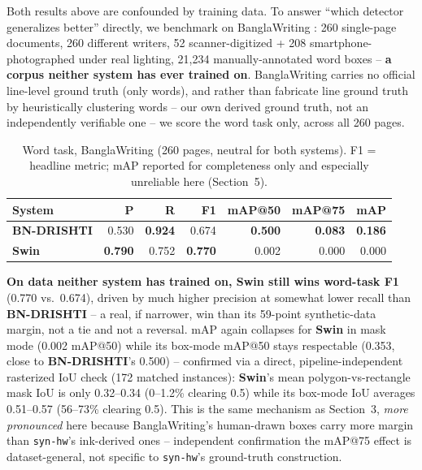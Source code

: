 \documentclass[10pt]{article}
\newcommand{\swin}{\textbf{Swin}}
\newcommand{\bnd}{\textbf{BN-DRISHTI}}
\begin{document}
Both results above are confounded by training data. To answer ``which detector
generalizes better'' directly, we benchmark on BanglaWriting
\cite{mridha2021banglawriting}: 260 single-page documents, 260 different writers, 52
scanner-digitized + 208 smartphone-photographed under real lighting, 21{,}234
manually-annotated word boxes -- \textbf{a corpus neither system has ever trained on}.
BanglaWriting carries no official line-level ground truth (only words), and rather
than fabricate line ground truth by heuristically clustering words -- our own derived
ground truth, not an independently verifiable one -- we score the word task only,
across all 260 pages.

\begin{table}[H]
\centering
\footnotesize
\caption{Word task, BanglaWriting (260 pages, neutral for both systems). F1 = headline
metric; mAP reported for completeness only and especially unreliable here (Section~5).}
\begin{tabular}{@{}lrrrrrr@{}}
\toprule
System & P & R & F1 & mAP@50 & mAP@75 & mAP \\
\midrule
\bnd{}         & 0.530 & \textbf{0.924} & 0.674 & \textbf{0.500} & \textbf{0.083} & \textbf{0.186} \\
\textbf{Swin} & \textbf{0.790} & 0.752 & \textbf{0.770} & 0.002 & 0.000 & 0.000 \\
\bottomrule
\end{tabular}
\end{table}

\textbf{On data neither system has trained on, \swin{} still wins word-task F1}
(0.770 vs.\ 0.674), driven by much higher precision at somewhat lower recall than
\bnd{} -- a real, if narrower, win than its 59-point synthetic-data margin, not a tie
and not a reversal. mAP again collapses for \swin{} in mask mode (0.002 mAP@50) while
its box-mode mAP@50 stays respectable (0.353, close to \bnd's 0.500) -- confirmed via
a direct, pipeline-independent rasterized IoU check (172 matched instances): \swin's
mean polygon-vs-rectangle mask IoU is only 0.32--0.34 (0--1.2\% clearing 0.5) while its
box-mode IoU averages 0.51--0.57 (56--73\% clearing 0.5). This is the same mechanism
as Section~3, \emph{more pronounced} here because BanglaWriting's human-drawn boxes
carry more margin than \texttt{syn-hw}'s ink-derived ones -- independent confirmation
the mAP@75 effect is dataset-general, not specific to \texttt{syn-hw}'s ground-truth
construction.
\end{document}

